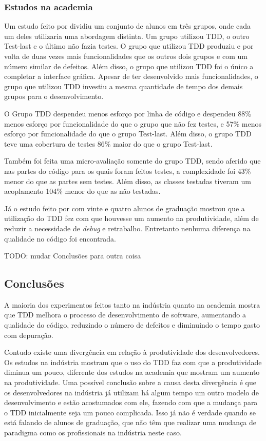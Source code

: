 \subsubsection{Estudos na academia}
\label{sub:estudos_na_academia}

Um estudo feito por  dividiu um conjunto de alunos em três grupos, onde cada um deles utilizaria uma abordagem distinta. Um grupo utilizou TDD, o outro Test-last e o último não fazia testes. O grupo que utilizou TDD produziu e por volta de duas vezes  mais funcionalidades que os outros dois grupos e com um número similar de defeitos. Além disso, o grupo que utilizou TDD foi o único a completar a interface gráfica. Apesar de ter desenvolvido mais funcionalidades, o grupo que utilizou TDD investiu a mesma quantidade de tempo dos demais grupos para o desenvolvimento.

O Grupo TDD despendeu menos esforço por linha de código e despendeu 88\% menos esforço por funcionalidade do que o grupo que não fez testes, e 57\% menos esforço por funcionalidade do que o grupo Test-last. Além disso, o grupo TDD teve uma cobertura de testes 86\% maior do que o grupo Test-last.

Também foi feita uma micro-avaliação somente do grupo TDD, sendo aferido que nas partes do código para os quais foram feitos testes, a complexidade foi 43\% menor do que as partes sem testes. Além disso, as classes testadas tiveram um acoplamento 104\% menor do que as não testadas.

Já o estudo feito por  com vinte e quatro alunos de graduação mostrou que a utilização do TDD fez com que houvesse um aumento na produtividade, além de reduzir a necessidade de \textit{debug} e retrabalho. Entretanto nenhuma diferença na qualidade no código foi encontrada.


TODO: mudar Conclusões para outra coisa

\subsection{Conclusões}
\label{sub:conclusoes}

A maioria dos experimentos feitos tanto na indústria quanto na academia mostra que TDD melhora o processo de desenvolvimento de software, aumentando a qualidade do código, reduzindo o número de defeitos e diminuindo o tempo gasto com depuração.

Contudo existe uma divergência em relação à produtividade dos desenvolvedores. Os estudos na indústria mostram que o uso do TDD faz com que a produtividade diminua um pouco, diferente dos estudos na academia que mostram um aumento na produtividade. Uma possível conclusão sobre a causa desta divergência é que os desenvolvedores na indústria já utilizam há algum tempo um outro modelo de desenvolvimento e estão acostumados com ele, fazendo com que a mudança para o TDD inicialmente seja um pouco complicada. Isso já não é verdade quando se está falando de alunos de graduação, que não têm que realizar uma mudança de paradigma como os profissionais na indústria neste caso.

